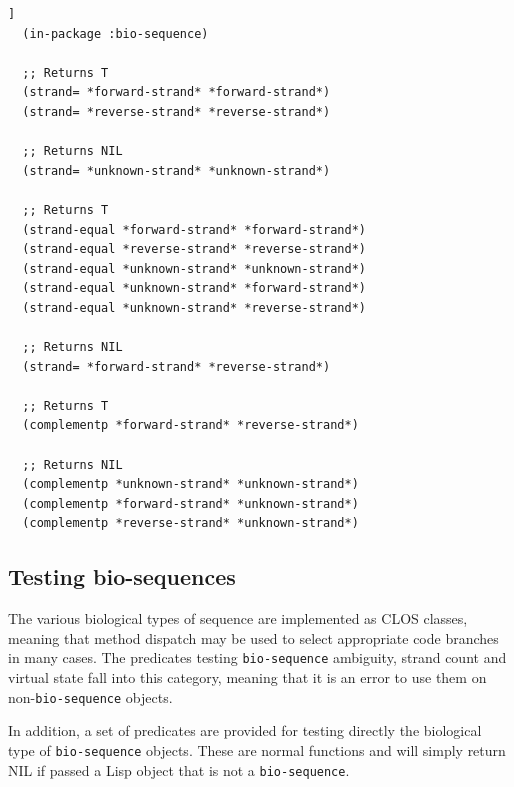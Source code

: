 \documentclass[a4paper, 12pt]{article}
\begin{document}
\begin{lstlisting}[caption={Sequence strand operations},
  label=lst:strand-ops-bioseq,float=[tbph]]
  (in-package :bio-sequence)

  ;; Returns T
  (strand= *forward-strand* *forward-strand*)
  (strand= *reverse-strand* *reverse-strand*)

  ;; Returns NIL
  (strand= *unknown-strand* *unknown-strand*)
  
  ;; Returns T
  (strand-equal *forward-strand* *forward-strand*)
  (strand-equal *reverse-strand* *reverse-strand*)
  (strand-equal *unknown-strand* *unknown-strand*)
  (strand-equal *unknown-strand* *forward-strand*)
  (strand-equal *unknown-strand* *reverse-strand*)
  
  ;; Returns NIL
  (strand= *forward-strand* *reverse-strand*)
  
  ;; Returns T
  (complementp *forward-strand* *reverse-strand*)

  ;; Returns NIL
  (complementp *unknown-strand* *unknown-strand*)
  (complementp *forward-strand* *unknown-strand*)
  (complementp *reverse-strand* *unknown-strand*)
\end{lstlisting}


\subsection{Testing bio-sequences}

The various biological types of sequence are implemented as CLOS
classes, meaning that method dispatch may be used to select
appropriate code branches in many cases. The predicates testing
\lstinline!bio-sequence! ambiguity, strand count and virtual state
fall into this category, meaning that it is an error to use them on
non-\lstinline!bio-sequence! objects.

In addition, a set of predicates are provided for testing directly the
biological type of \lstinline!bio-sequence! objects. These are normal
functions and will simply return NIL if passed a Lisp object that is
not a \lstinline!bio-sequence!.
\end{document}
